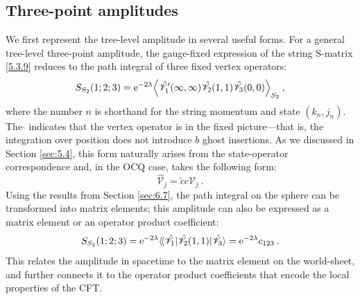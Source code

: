 \subsection*{Three-point amplitudes}

We first represent the tree-level amplitude in several useful forms. For a general tree-level three-point amplitude, the gauge-fixed expression of the string S-matrix \eqref{5.3.9} reduces to the path integral of three fixed vertex operators:
\begin{equation}
	S_{S_{2}}(1; 2; 3) = \mathrm{e}^{-2 \lambda} \Bigl\langle \hat{\mathscr{V}}_{1}^{\prime}(\infty, \infty) 
	\hat{\mathscr{V}}_{2}(1,1) \hat{\mathscr{V}}_{3}(0,0) \Bigr\rangle_{S_{2}} \:, \label{9.1.4}
\end{equation}
where the number $n$ is shorthand for the string momentum and state $(k_n, j_n)$.
The $\hat{}$ indicates that the vertex operator is in the fixed picture—that is, the integration over position does not introduce $b$ ghost insertions. 
As we discussed in Section \ref{sec:5.4}, this form naturally arises from the state-operator correspondence and, in the OCQ case, takes the following form:
\begin{equation}
	\hat{\mathscr{V}}_{j} = \tilde{c} c \mathscr{V}_{j} \:.
	\label{9.1.5}
\end{equation}
Using the results from Section \ref{sec:6.7}, the path integral on the sphere can be transformed into matrix elements; this amplitude can also be expressed as a matrix element or an operator product coefficient:
\begin{equation}
	S_{S_{2}}(1; 2; 3) = \mathrm{e}^{-2 \lambda}\langle\!\langle\hat{\mathscr{V}}_{1}|\hat{\mathscr{V}}_{2}(1,1)|\hat{\mathscr{V}}_{3}\rangle
	= \mathrm{e}^{-2 \lambda} c_{123} \:. \label{9.1.6}
\end{equation}
This relates the amplitude in spacetime to the matrix element on the world-sheet, and further connects it to the operator product coefficients that encode the local properties of the CFT.

